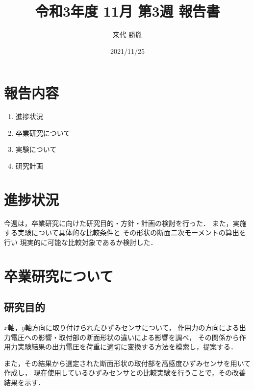 \documentclass[twocolumn,a4j]{jsarticle}
\author{来代 勝胤}
\title{令和3年度 11月 第3週 報告書}
\date{2021/11/25}
\begin{document}
\columnseprule=0.1mm

\maketitle
\section*{報告内容}
\begin{enumerate}[1.]
    \item 進捗状況
    \item 卒業研究について
    \item 実験について
    \item 研究計画
\end{enumerate}

\section{進捗状況}
今週は，卒業研究に向けた研究目的・方針・計画の検討を行った．
また，実施する実験について具体的な比較条件と
その形状の断面二次モーメントの算出を行い
現実的に可能な比較対象であるか検討した．

\section{卒業研究について}
\subsection{研究目的}
    $x$軸，$y$軸方向に取り付けられたひずみセンサについて，
    作用力の方向による出力電圧への影響・取付部の断面形状の違いによる影響を調べ，
    その関係から作用力実験結果の出力電圧を荷重に適切に変換する方法を模索し，提案する．
    \par
    また，その結果から選定された断面形状の取付部を高感度ひずみセンサを用いて作成し，
    現在使用しているひずみセンサとの比較実験を行うことで，その改善結果を示す．\\
\end{document}
